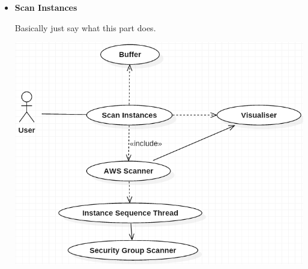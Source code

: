 \documentclass[a4paper,12pt]{report}
\begin{document}
\begin{itemize}
	\item \textbf{Scan Instances}
	\begin{flushleft}
		Basically just say what this part does.
	\end{flushleft}
	\begin{center}
		\includegraphics[width=1\textwidth] {./Diagrams/ScanInstancesUseCase.png}\\[0.4cm]    
	\end{center}

\end{itemize}
\newpage
\end{document}
